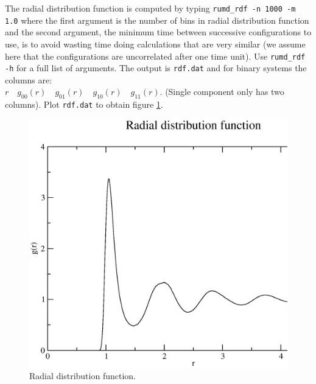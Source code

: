 The radial distribution function is computed by typing 
\verb=rumd_rdf -n 1000 -m 1.0= 
where the first argument is the number of bins in radial
distribution function and the second argument, the minimum time
between successive configurations to use, is to avoid wasting 
time doing calculations that are very similar (we assume here that the
 configurations are  uncorrelated after one time unit). Use
 \verb|rumd_rdf -h| for a full list of arguments. 
The output is \verb=rdf.dat= and for binary systems the columns are:\\
$r \quad g_{00}(r) \quad  g_{01}(r)\quad  g_{10}(r)\quad
g_{11}(r)$. (Single component only has two columns). Plot
\verb=rdf.dat= to obtain figure \ref{rdf}.  
\begin{figure}[!ht]
  \centering
  \includegraphics[scale=0.3]{level1/LJrdf.eps}
  \caption{Radial distribution function.}\label{rdf}
\end{figure}

